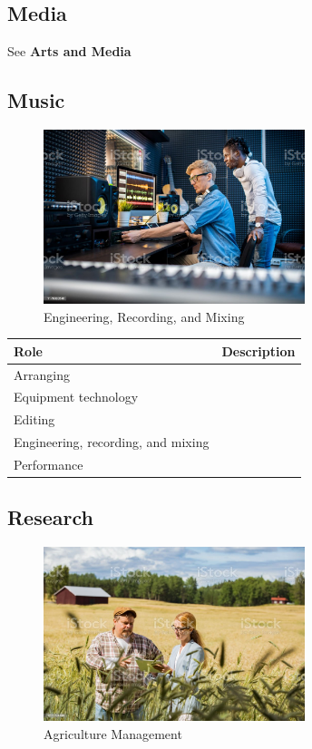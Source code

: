 \subsection{Media}
See \textbf{Arts and Media}

\subsection{Music}

\begin{figure}[H]
	\begin{center}
		\caption{Engineering, Recording, and Mixing}
		\vskip 4pt
		\includegraphics[height=2in]{images/careers/istockphoto-1176082646-1024x1024.jpg}
	\end{center}
\end{figure}

\begin{table}[H]
	\begin{center}
		\begin{tabular}{p{1.3in}|p{3in}} 
			\textbf{Role} & \textbf{Description}\\
			\hline
			Arranging & \\
			\hline
			Equipment technology & \\
			\hline
			Editing & \\
			\hline
			Engineering, recording, and mixing & \\
			\hline
			Performance & \\
			\hline
		\end{tabular}
	\end{center}
\end{table}

\subsection{Research}

\begin{figure}[H]
	\begin{center}
		\caption{Agriculture Management}
		\vskip 4pt
		\includegraphics[height=2in]{images/careers/istockphoto-1272791496-1024x1024.jpg}
	\end{center}
\end{figure}

